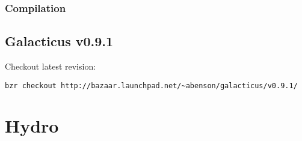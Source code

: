 \documentclass[a4paper,english,10.5pt]{scrartcl}
\begin{document}
\subsubsection{Compilation}


\subsection{Galacticus v0.9.1}

Checkout latest revision: 
\begin{verbatim}
bzr checkout http://bazaar.launchpad.net/~abenson/galacticus/v0.9.1/
\end{verbatim}

\section{Hydro}


\renewcommand{\bibsection}{\section{References}}
\setlength{\bibhang}{1.24cm}
\setlength{\parindent}{3cm}
\setlength{\bibsep}{0cm}

\gdef\harvardand{\&}
\end{document}
